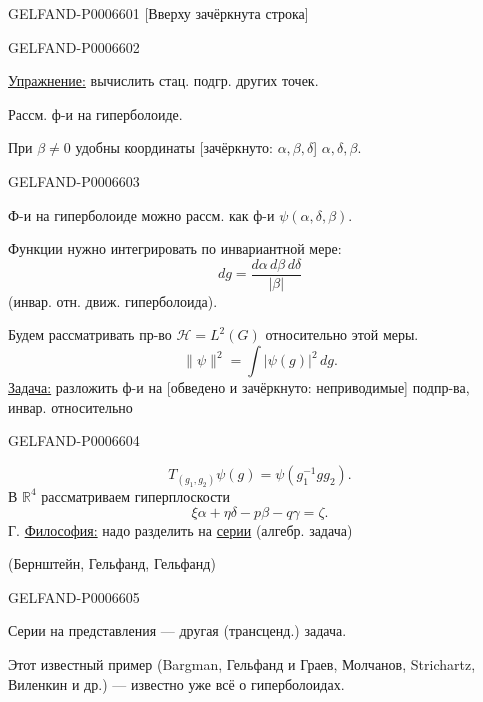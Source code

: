 \begin{GelfandAdjacentEvidence}{GELFAND-P000660}{1}
[Вверху зачёркнута строка]
\end{GelfandAdjacentEvidence}
\begin{GelfandAdjacentEvidence}{GELFAND-P000660}{2}


\underline{Упражнение:} вычислить стац. подгр. других точек.

Рассм. ф-и на гиперболоиде.

При \(\beta\ne0\) удобны координаты [зачёркнуто: \(\alpha,\beta,\delta\)]
\(\alpha,\delta,\beta\).
\end{GelfandAdjacentEvidence}
\begin{GelfandAdjacentEvidence}{GELFAND-P000660}{3}


Ф-и на гиперболоиде можно рассм. как ф-и \(\psi(\alpha,\delta,\beta)\).

Функции нужно интегрировать по инвариантной мере:
\[
dg=\frac{d\alpha\,d\beta\,d\delta}{|\beta|}
\]
(инвар. отн. движ. гиперболоида).

Будем рассматривать пр-во \(\mathcal H=L^2(G)\) относительно этой меры.
\[
\|\psi\|^2=\int|\psi(g)|^2\,dg.
\]
\underline{Задача:} разложить ф-и на [обведено и зачёркнуто: неприводимые]
подпр-ва, инвар. относительно
\end{GelfandAdjacentEvidence}
\begin{GelfandAdjacentEvidence}{GELFAND-P000660}{4}

\[
T_{(g_1,g_2)}\psi(g)=\psi(g_1^{-1}gg_2).
\]
В \(\mathbb R^4\) рассматриваем гиперплоскости
\[
\xi\alpha+\eta\delta-p\beta-q\gamma=\zeta.
\]
Г. \underline{Философия:} надо разделить на \underline{серии} (алгебр. задача)

(Бернштейн, Гельфанд, Гельфанд)
\end{GelfandAdjacentEvidence}
\begin{GelfandAdjacentEvidence}{GELFAND-P000660}{5}


Серии на представления --- другая (трансценд.) задача.

Этот известный пример (Bargman, Гельфанд и Граев, Молчанов, Strichartz, Виленкин
и др.) --- известно уже всё о гиперболоидах.
\end{GelfandAdjacentEvidence}
